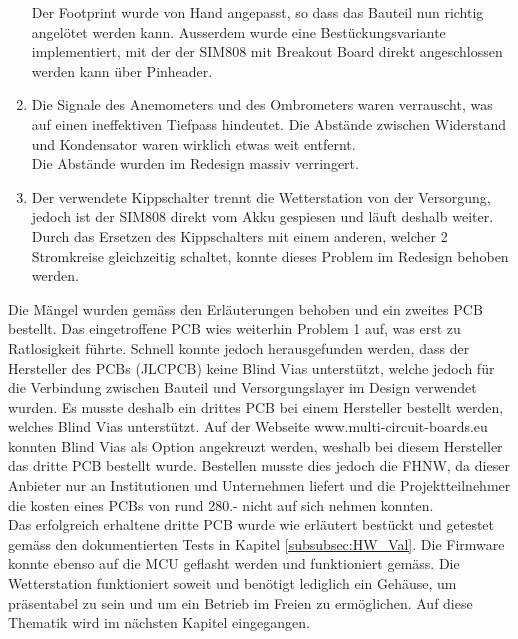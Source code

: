 \begin{enumerate}
Der Footprint wurde von Hand angepasst, so dass das Bauteil nun richtig angelötet werden kann. Ausserdem wurde eine Bestückungsvariante implementiert, mit der der SIM808 mit Breakout Board direkt angeschlossen werden kann über Pinheader.
\item Die Signale des Anemometers und des Ombrometers waren verrauscht, was auf einen ineffektiven Tiefpass hindeutet. Die Abstände zwischen Widerstand und Kondensator waren wirklich etwas weit entfernt.\\
Die Abstände wurden im Redesign massiv verringert.
\item Der verwendete Kippschalter trennt die Wetterstation von der Versorgung, jedoch ist der SIM808 direkt vom Akku gespiesen und läuft deshalb weiter.\\
Durch das Ersetzen des Kippschalters mit einem anderen, welcher 2 Stromkreise gleichzeitig schaltet, konnte dieses Problem im Redesign behoben werden.
\end{enumerate}
Die Mängel wurden gemäss den Erläuterungen behoben und ein zweites PCB bestellt. Das eingetroffene PCB wies weiterhin Problem 1 auf, was erst zu Ratlosigkeit führte. Schnell konnte jedoch herausgefunden werden, dass der Hersteller des PCBs (JLCPCB) keine Blind Vias unterstützt, welche jedoch für die Verbindung zwischen Bauteil und Versorgungslayer im Design verwendet wurden. Es musste deshalb ein drittes PCB bei einem Hersteller bestellt werden, welches Blind Vias unterstützt. Auf der Webseite www.multi-circuit-boards.eu konnten Blind Vias als Option angekreuzt werden, weshalb bei diesem Hersteller das dritte PCB bestellt wurde. Bestellen musste dies jedoch die FHNW, da dieser Anbieter nur an Institutionen und Unternehmen liefert und die Projektteilnehmer die kosten eines PCBs von rund 280.- nicht auf sich nehmen konnten. \\[0.5cm]
Das erfolgreich erhaltene dritte PCB wurde wie erläutert bestückt und getestet gemäss den dokumentierten Tests in Kapitel \ref{subsubsec:HW_Val}. Die Firmware konnte ebenso auf die MCU geflasht werden und funktioniert gemäss.  Die Wetterstation funktioniert soweit und benötigt lediglich ein Gehäuse, um präsentabel zu sein und um ein Betrieb im Freien zu ermöglichen. Auf diese Thematik wird im nächsten Kapitel eingegangen.
